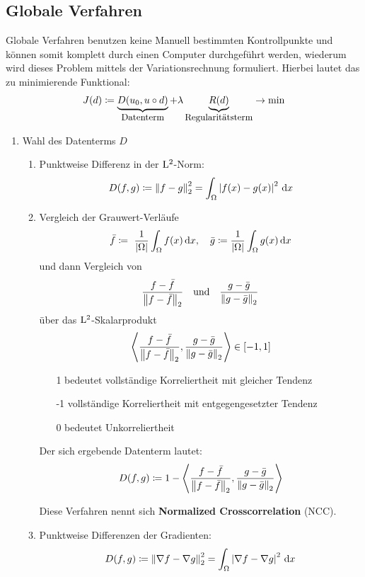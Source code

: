 \subsection{Globale Verfahren}

Globale Verfahren benutzen keine Manuell bestimmten Kontrollpunkte und können somit komplett durch einen Computer durchgeführt werden, wiederum wird dieses Problem mittels der Variationsrechnung formuliert.
Hierbei lautet das zu minimierende Funktional:
\[J(d) \coloneqq \underbrace{\vphantom{R(d)}D(u_0,u \circ d)}_{\text{\small Datenterm}} + \lambda \underbrace{R(d)}_{\text{\small Regularitätsterm}} \to \min\]

\begin{enumerate}
    \item Wahl des Datenterms $D$
    \begin{enumerate}
        \item Punktweise Differenz in der $\mathrm{L}^2$-Norm:
            \[D(f,g)  \coloneqq  \left\| f-g \right\|_2^2 = \int_\Omega \left| f(x)-g(x) \right|^2 \, {\operatorname{d}\!{x}}\]
        \item Vergleich der Grauwert-Verläufe
            \[\bar{f}  \coloneqq \ \frac{1}{\left| \Omega \right|} \int_\Omega f(x) \, {\operatorname{d}\!{x}}, \quad \bar{g}  \coloneqq  \frac{1}{\left| \Omega \right|} \int_\Omega g(x) \, {\operatorname{d}\!{x}}\]
            und dann Vergleich von
            \[\frac{f - \bar{f}}{\left\| f-\bar{f} \right\|_2} \quad \text{und} \quad \frac{g - \bar{g}}{\left\| g-\bar{g} \right\|_2}\]
            über das $\mathrm{L}^2$-Skalarprodukt
            \[\left \langle \frac{f - \bar{f}}{\left\| f-\bar{f} \right\|_2},\frac{g - \bar{g}}{\left\| g-\bar{g} \right\|_2} \right \rangle \in [-1,1]\]

            \begin{enumerate}
                \item[1] bedeutet vollständige Korreliertheit mit gleicher Tendenz
                \item[-1] vollständige Korreliertheit mit entgegengesetzter Tendenz
                \item[0] bedeutet Unkorreliertheit
            \end{enumerate}

            Der sich ergebende Datenterm lautet:
            \[D(f,g)  \coloneqq  1 - \left \langle \frac{f - \bar{f}}{\left\| f-\bar{f} \right\|_2},\frac{g - \bar{g}}{\left\| g-\bar{g} \right\|_2} \right \rangle\]

            Diese Verfahren nennt sich \textbf{Normalized Crosscorrelation} (NCC).
            \item Punktweise Differenzen der Gradienten:
                \[D(f,g)  \coloneqq  \left\| \nabla f - \nabla g \right\|_2^2 = \int_\Omega \left| \nabla f - \nabla g \right|^2 \, {\operatorname{d}\!{x}}\]


\end{enumerate}
\end{enumerate}
